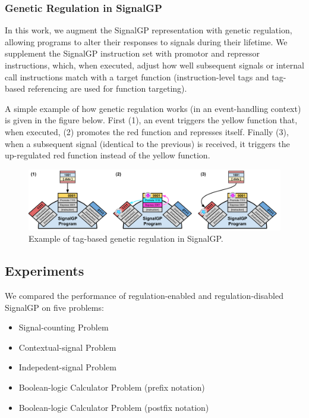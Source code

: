\documentclass[]{book}
\providecommand{\tightlist}{%
  \setlength{\itemsep}{0pt}\setlength{\parskip}{0pt}}
\begin{document}
\hypertarget{genetic-regulation-in-signalgp}{%
\subsubsection{Genetic Regulation in SignalGP}\label{genetic-regulation-in-signalgp}}

In this work, we augment the SignalGP representation with genetic regulation, allowing programs to alter their responses to signals during their lifetime.
We supplement the SignalGP instruction set with promotor and repressor instructions, which, when executed, adjust how well subsequent signals or internal call instructions match with a target function (instruction-level tags and tag-based referencing are used for function targeting).

A simple example of how genetic regulation works (in an event-handling context) is given in the figure below. First (1), an event triggers the yellow function that, when executed, (2) promotes the red function and represses itself. Finally (3), when a subsequent signal (identical to the previous) is received, it triggers the up-regulated red function instead of the yellow function.

\begin{figure}
\centering
\includegraphics{./media/regulation-example-cartoon.png}
\caption{Example of tag-based genetic regulation in SignalGP.}
\end{figure}

\hypertarget{experiments}{%
\subsection{Experiments}\label{experiments}}

We compared the performance of regulation-enabled and regulation-disabled SignalGP on five problems:

\begin{itemize}
\tightlist
\item
  Signal-counting Problem
\item
  Contextual-signal Problem
\item
  Indepedent-signal Problem
\item
  Boolean-logic Calculator Problem (prefix notation)
\item
  Boolean-logic Calculator Problem (postfix notation)
\end{itemize}
\end{document}
